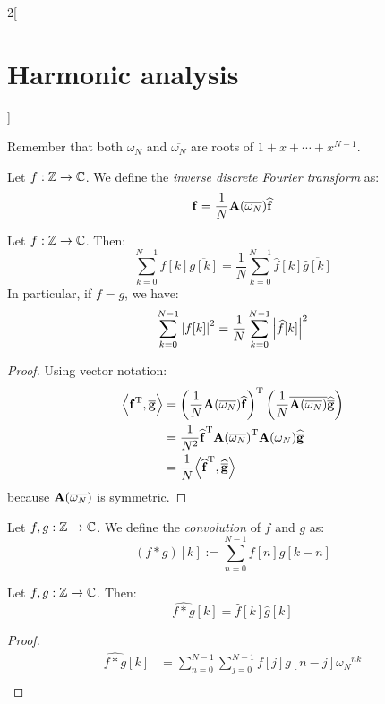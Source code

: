 \documentclass[../../../main_math.tex]{subfiles}
\begin{document}
\begin{multicols}{2}[\section{Harmonic analysis}]
\begin{lemma}
  \end{lemma}
  \begin{sproof}
    Remember that both ${\omega_N}$ and $\overline{\omega_N}$ are roots of $1+x+\cdots+x^{N-1}$.
  \end{sproof}
  \begin{definition}
    Let $f:\mathbb{Z}\rightarrow\mathbb{C}$. We define the \emph{inverse discrete Fourier transform} as:
    $$\boldsymbol{\mathrm{f}}=\frac{1}{N}\boldsymbol{\mathrm{A}}(\overline{\omega_N})\boldsymbol{\mathrm{\widehat{f}}}$$
  \end{definition}
  \begin{theorem}
    Let $f:\mathbb{Z}\rightarrow\mathbb{C}$. Then:
    $$\sum_{k=0}^{N-1}f[k]\overline{g[k]}=\frac{1}{N}\sum_{k=0}^{N-1}\widehat{f}[k]\overline{\widehat{g}[k]}$$
    In particular, if $f=g$, we have:
    $$\sum_{k=0}^{N-1}\abs{f[k]}^2=\frac{1}{N}\sum_{k=0}^{N-1}\abs{\widehat{f}[k]}^2$$
  \end{theorem}
  \begin{proof}
    Using vector notation:
    \begin{align*}
      {\left\langle{\boldsymbol{\mathrm{f}}}^{\mathrm{T}},\overline{\boldsymbol{\mathrm{g}}}\right\rangle} & ={\left(\frac{1}{N}\boldsymbol{\mathrm{A}}(\overline{\omega_N})\boldsymbol{\mathrm{\widehat{f}}}\right)}^{\mathrm{T}}\left(\frac{1}{N}\overline{\boldsymbol{\mathrm{A}}(\overline{\omega_N})}\boldsymbol{\mathrm{\widehat{\overline{g}}}}\right) \\
                                                   & =\frac{1}{N^2}{\boldsymbol{\mathrm{\widehat{f}}}}^{\mathrm{T}}{\boldsymbol{\mathrm{A}}(\overline{\omega_N})}^{\mathrm{T}}\boldsymbol{\mathrm{A}}({\omega_N})\boldsymbol{\mathrm{\widehat{\overline{g}}}}                                            \\
                                                   & =\frac{1}{N}{\left\langle{\boldsymbol{\mathrm{\widehat{f}}}}^{\mathrm{T}},\boldsymbol{\mathrm{\widehat{\overline{g}}}}\right\rangle}
    \end{align*}
    because $\boldsymbol{\mathrm{A}}(\overline{\omega_N})$ is symmetric.
  \end{proof}
  \begin{definition}
    Let $f,g:\mathbb{Z}\rightarrow\mathbb{C}$. We define the \emph{convolution} of $f$ and $g$ as:
    $$(f*g)[k]:=\sum_{n=0}^{N-1}f[n]g[k-n]$$
  \end{definition}
  \begin{lemma}
    Let $f,g:\mathbb{Z}\rightarrow\mathbb{C}$. Then:
    $$\widehat{f*g}[k]=\widehat{f}[k]\widehat{g}[k]$$
  \end{lemma}
  \begin{proof}
    \begin{align*}
      \widehat{f*g}[k] & =\sum_{n=0}^{N-1}\sum_{j=0}^{N-1}f[j]g[n-j]{\omega_N}^{nk}                    \\

\end{align*}
\end{proof}
\end{multicols}
\end{document}
